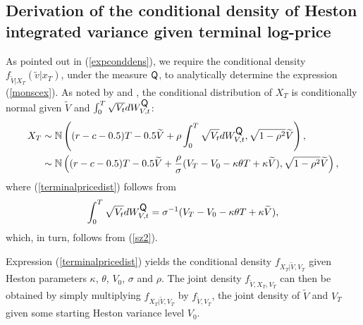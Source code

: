 \documentclass{rQUF2e}
\newcommand{\QQ}{\mathop{\mbox{\sf Q}}}
\theoremstyle{plain}
\theoremstyle{definition}
\begin{document}
	\subsection{Derivation of the conditional density of Heston integrated variance given terminal log-price }
	\label{hestproof}
	As pointed out in (\ref{expconddens}), we require the conditional density $f_{\tilde{V}|X_T}(\tilde{v}|x_T)$, under the measure $\QQ$, to analytically determine the expression (\ref{monscex}). As noted by \citet{broadie_kaya} and \citet{glasserman_kim}, the conditional distribution of $X_T$ is conditionally normal given $\widetilde{V}$ and $\int_{0}^{T}\sqrt{V_t} dW_{V,t}^{\QQ}$:
	\begin{align}
	X_T &\sim \mathbb{N} \left( (r-c-0.5)T - 0.5 \widetilde{V} + \rho \int_{0}^{T}\sqrt{V_t} dW_{V,t}^{\QQ}, \sqrt{1-\rho^2} \widetilde{V}  \right), \nonumber \\
	&\sim \mathbb{N} \left( (r-c-0.5)T - 0.5 \widetilde{V} + \frac{\rho}{\sigma} (V_T - V_0 - \kappa \theta T + \kappa \widetilde{V}), \sqrt{1-\rho^2} \widetilde{V}  \right) \label{terminalpricedist},
	\end{align}
	where (\ref{terminalpricedist}) follows from
	\begin{equation*}
	\int_{0}^{T}\sqrt{V_t} dW_{V,t}^{\QQ} = \sigma^{-1}(V_T - V_0 - \kappa \theta T + \kappa \widetilde{V}),
	\end{equation*}
	which, in turn, follows from (\ref{sz2}).
	
	Expression (\ref{terminalpricedist}) yields the conditional density $f_{X_T|\widetilde{V}, V_T}$ given Heston parameters $\kappa$, $\theta$, $V_0$, $\sigma$ and $\rho$. The joint density $f_{\widetilde{V}, X_T, V_T}$ can then be obtained by simply multiplying $f_{X_T|\widetilde{V}, V_T}$ by $f_{\widetilde{V}, V_T}$, the joint density of $\widetilde{V}$ and $V_T$ given some starting Heston variance level $V_0$. 
	
\end{document}
